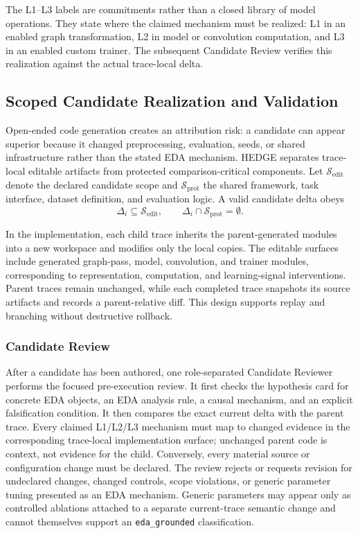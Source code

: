 The L1--L3 labels are commitments rather than a closed library of model operations. They state where the claimed mechanism must be realized: L1 in an enabled graph transformation, L2 in model or convolution computation, and L3 in an enabled custom trainer. The subsequent Candidate Review verifies this realization against the actual trace-local delta.

\subsection{Scoped Candidate Realization and Validation}
\label{sec:scoped_realization}

Open-ended code generation creates an attribution risk: a candidate can appear superior because it changed preprocessing, evaluation, seeds, or shared infrastructure rather than the stated EDA mechanism. HEDGE separates trace-local editable artifacts from protected comparison-critical components. Let $\mathcal{S}_{\mathrm{edit}}$ denote the declared candidate scope and $\mathcal{S}_{\mathrm{prot}}$ the shared framework, task interface, dataset definition, and evaluation logic. A valid candidate delta obeys
\begin{equation}
    \Delta_i\subseteq\mathcal{S}_{\mathrm{edit}},\qquad
    \Delta_i\cap\mathcal{S}_{\mathrm{prot}}=\emptyset.
    \label{eq:edit_scope}
\end{equation}

In the implementation, each child trace inherits the parent-generated modules into a new workspace and modifies only the local copies. The editable surfaces include generated graph-pass, model, convolution, and trainer modules, corresponding to representation, computation, and learning-signal interventions. Parent traces remain unchanged, while each completed trace snapshots its source artifacts and records a parent-relative diff. This design supports replay and branching without destructive rollback.

\subsubsection{Candidate Review}

After a candidate has been authored, one role-separated Candidate Reviewer performs the focused pre-execution review. It first checks the hypothesis card for concrete EDA objects, an EDA analysis rule, a causal mechanism, and an explicit falsification condition. It then compares the exact current delta with the parent trace. Every claimed L1/L2/L3 mechanism must map to changed evidence in the corresponding trace-local implementation surface; unchanged parent code is context, not evidence for the child. Conversely, every material source or configuration change must be declared. The review rejects or requests revision for undeclared changes, changed controls, scope violations, or generic parameter tuning presented as an EDA mechanism. Generic parameters may appear only as controlled ablations attached to a separate current-trace semantic change and cannot themselves support an \texttt{eda\_grounded} classification.

